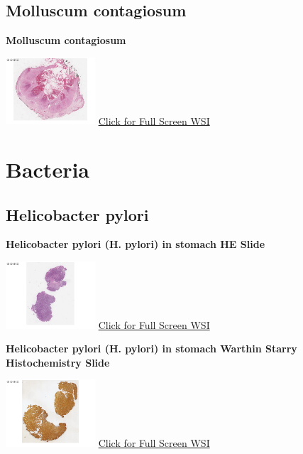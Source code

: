\documentclass[
  letterpaper,
  paper=6in:9in,
  pagesize=pdftex,
  headinclude=on,
  footinclude=on,
  12pt]{scrbook}
\begin{document}
\hypertarget{sec-molluscum-contagiosum}{%
\section{Molluscum contagiosum}\label{sec-molluscum-contagiosum}}

\textbf{Molluscum contagiosum}

\href{https://images.patolojiatlasi.com/molluscum-contagiosum/HE.html}{\includegraphics[width=0.25\textwidth,height=\textheight]{./screenshots/molluscum-contagiosum_screenshot.png}}
\href{https://images.patolojiatlasi.com/molluscum-contagiosum/HE.html}{Click
for Full Screen WSI}

\hypertarget{sec-bacteria}{%
\chapter{Bacteria}\label{sec-bacteria}}

\hypertarget{sec-helicobacter-pylori}{%
\section{Helicobacter pylori}\label{sec-helicobacter-pylori}}

\textbf{Helicobacter pylori (H. pylori) in stomach HE Slide}

\href{https://images.patolojiatlasi.com/helicobacterpylori/HE.html}{\includegraphics[width=0.25\textwidth,height=\textheight]{./screenshots/helicobacterpylori_screenshot.png}}
\href{https://images.patolojiatlasi.com/helicobacterpylori/HE.html}{Click
for Full Screen WSI}

\textbf{Helicobacter pylori (H. pylori) in stomach Warthin Starry
Histochemistry Slide}

\href{https://images.patolojiatlasi.com/helicobacterpylori/warthinstarry.html}{\includegraphics[width=0.25\textwidth,height=\textheight]{./screenshots/helicobacterpyloriWS_screenshot.png}}
\href{https://images.patolojiatlasi.com/helicobacterpylori/warthinstarry.html}{Click
for Full Screen WSI}
\end{document}
